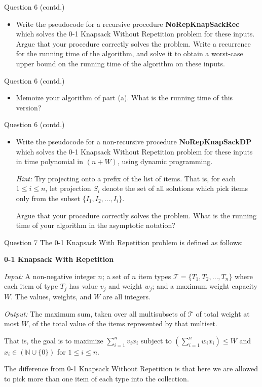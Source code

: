 \documentclass{beamer}
\begin{document}
\begin{frame}{Question 6 (contd.)}
\begin{itemize}
  \item[(a)] Write the pseudocode for a recursive procedure \textbf{NoRepKnapSackRec} which solves the 0-1 Knapsack Without Repetition problem for these inputs. Argue that your procedure correctly solves the problem. Write a recurrence for the running time of the algorithm, and solve it to obtain a worst-case upper bound on the running time of the algorithm on these inputs.
\end{itemize}
\end{frame}

\begin{frame}{Question 6 (contd.)}
\begin{itemize}
  \item[(b)] Memoize your algorithm of part (a). What is the running time of this version?
\end{itemize}
\end{frame}

\begin{frame}{Question 6 (contd.)}
\begin{itemize}
  \item[(c)] Write the pseudocode for a non-recursive procedure \textbf{NoRepKnapSackDP} which solves the 0-1 Knapsack Without Repetition problem for these inputs in time polynomial in $(n + W)$, using dynamic programming.

  \textit{Hint:} Try projecting onto a prefix of the list of items. That is, for each $1 \leq i \leq n$, let projection $S_i$ denote the set of all solutions which pick items only from the subset $\{I_1, I_2, \ldots, I_i\}$.

  Argue that your procedure correctly solves the problem. What is the running time of your algorithm in the asymptotic notation?
\end{itemize}
\end{frame}


\begin{frame}{Question 7}
The 0-1 Knapsack With Repetition problem is defined as follows:

\medskip
\textbf{0-1 Knapsack With Repetition}

\textit{Input:} A non-negative integer $n$; a set of $n$ item types $\mathcal{T} = \{T_1, T_2, \ldots, T_n\}$ where each item of type $T_j$ has value $v_j$ and weight $w_j$; and a maximum weight capacity $W$. The values, weights, and $W$ are all integers.

\textit{Output:} The maximum sum, taken over all multisubsets of $\mathcal{T}$ of total weight at most $W$, of the total value of the items represented by that multiset.

That is, the goal is to maximize $\sum_{i=1}^{n} v_i x_i$ subject to $\left(\sum_{i=1}^{n} w_i x_i\right) \leq W$ and $x_i \in (\mathbb{N} \cup \{0\})$ for $1 \leq i \leq n$.

\medskip
The difference from 0-1 Knapsack Without Repetition is that here we are allowed to pick more than one item of each type into the collection.
\end{frame}
\end{document}
